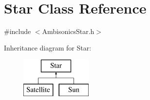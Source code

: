 \hypertarget{class_star}{\section{Star Class Reference}
\label{class_star}
}


{\ttfamily \#include $<$Ambisonics\-Star.\-h$>$}

Inheritance diagram for Star\-:\begin{figure}[H]
\begin{center}
\leavevmode
\includegraphics[height=2.000000cm]{class_star}
\end{center}
\end{figure}

